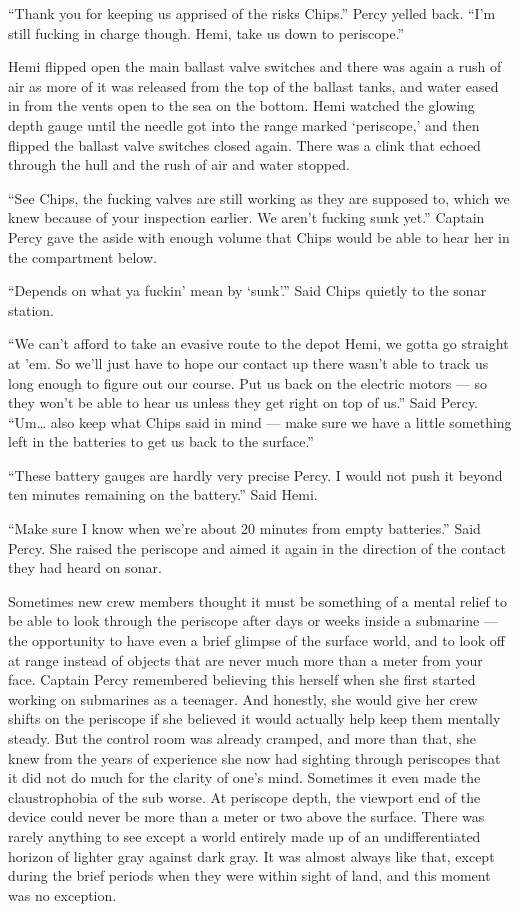 \documentclass[]{scrbook}
\begin{document}
``Thank you for keeping us apprised of the risks Chips.'' Percy yelled
back. ``I'm still fucking in charge though. Hemi, take us down to
periscope.''

Hemi flipped open the main ballast valve switches and there was again a
rush of air as more of it was released from the top of the ballast
tanks, and water eased in from the vents open to the sea on the bottom.
Hemi watched the glowing depth gauge until the needle got into the range
marked `periscope,' and then flipped the ballast valve switches closed
again. There was a clink that echoed through the hull and the rush of
air and water stopped.

``See Chips, the fucking valves are still working as they are supposed
to, which we knew because of your inspection earlier. We aren't fucking
sunk yet.'' Captain Percy gave the aside with enough volume that Chips
would be able to hear her in the compartment below.

``Depends on what ya fuckin' mean by `sunk'.'' Said Chips quietly to the
sonar station.

``We can't afford to take an evasive route to the depot Hemi, we gotta
go straight at 'em. So we'll just have to hope our contact up there
wasn't able to track us long enough to figure out our course. Put us
back on the electric motors --- so they won't be able to hear us unless
they get right on top of us.'' Said Percy. ``Um\ldots{} also keep what
Chips said in mind --- make sure we have a little something left in the
batteries to get us back to the surface.''

``These battery gauges are hardly very precise Percy. I would not push
it beyond ten minutes remaining on the battery.'' Said Hemi.

``Make sure I know when we're about 20 minutes from empty batteries.''
Said Percy. She raised the periscope and aimed it again in the direction
of the contact they had heard on sonar.

Sometimes new crew members thought it must be something of a mental
relief to be able to look through the periscope after days or weeks
inside a submarine --- the opportunity to have even a brief glimpse of
the surface world, and to look off at range instead of objects that are
never much more than a meter from your face. Captain Percy remembered
believing this herself when she first started working on submarines as a
teenager. And honestly, she would give her crew shifts on the periscope
if she believed it would actually help keep them mentally steady. But
the control room was already cramped, and more than that, she knew from
the years of experience she now had sighting through periscopes that it
did not do much for the clarity of one's mind. Sometimes it even made
the claustrophobia of the sub worse. At periscope depth, the viewport
end of the device could never be more than a meter or two above the
surface. There was rarely anything to see except a world entirely made
up of an undifferentiated horizon of lighter gray against dark gray. It
was almost always like that, except during the brief periods when they
were within sight of land, and this moment was no exception.
\end{document}
